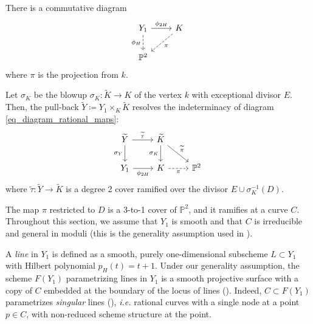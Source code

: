 \documentclass[11pt]{amsart}
\theoremstyle{definition}
\newcommand{\pr}[1]{\mathbb P^{#1}}
\begin{document}
There is a commutative diagram
\begin{equation}
\label{eq_diagram_rational_maps}
\begin{tikzcd}
	{Y_1} & {K} \\
	{\pr 2}
	\arrow["{\phi_H}"', from=1-1, to=2-1, dashed]
	\arrow["{\phi_{2H}}", from=1-1, to=1-2]
	\arrow["{\pi}", from=1-2, to=2-1, dashed]
\end{tikzcd}
\end{equation}
where $\pi$ is the projection from $k$.


Let $\sigma_K$ be the blowup $\sigma_K\colon \widetilde{K}\to K$ of the vertex $k$ with exceptional divisor $E$. Then, the pull-back $\widetilde{Y}\coloneqq Y_1\times_K \widetilde{K}$ resolves the indeterminacy of diagram \eqref{eq_diagram_rational_maps}:
\begin{equation*}
\begin{tikzcd}
	\widetilde{Y} & \widetilde{K} & \\
	{Y_1} & {K} & {\pr 2}
	\ar[swap, "{\widetilde{\tau}}"', from=1-1, to=1-2]
	\arrow[swap, "{\phi_{2H}}", from=2-1, to=2-2]
	\arrow[swap, "{\sigma_Y}", from=1-1, to=2-1]
	\arrow[swap, "{\sigma_K}", from=1-2, to=2-2]
	\arrow["{\widetilde{\pi}}", from=1-2, to=2-3]
	\arrow[swap, "{\pi}", from=2-2, to=2-3, dashed]
\end{tikzcd}
\end{equation*}
where $\widetilde{\tau}\colon \widetilde{Y}\to \widetilde{K}$ is a degree 2 cover ramified over the divisor $E\cup \sigma_K^{-1}(D)$.

The map $\pi$ restricted to $D$ is a 3-to-1 cover of $\pr 2$, and it ramifies at a curve $C$. Throughout this section, we assume that $Y_1$ is smooth and that $C$ is irreducible and general in moduli (this is the generality assumption used in \cite{Tih82}).

A \emph{line} in $Y_1$ is defined as a smooth, purely one-dimensional subscheme $L \subset Y_1$ with Hilbert polynomial $p_H(t)=t+1$. Under our generality assumption, the scheme $F(Y_1)$ parametrizing lines in $Y_1$ is a smooth projective surface with a copy of $C$ embedded at the boundary of the locus of lines (\cite[Thm 4]{Tih82}). Indeed, $C\subset F(Y_1)$ parametrizes \emph{singular} lines (\cite[\S 3, \S 8]{Tih82}), \textit{i.e.} rational curves with a single node at a point $p \in C$, with non-reduced scheme structure at the point.
\end{document}

